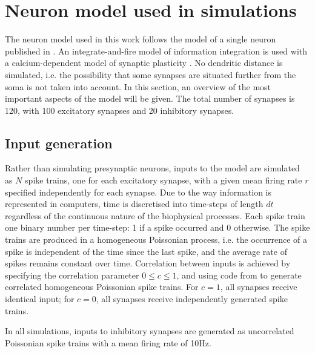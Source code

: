 \documentclass[a4paper,12pt]{report}
\theoremstyle{definition}
\begin{document}
\section{Neuron model used in simulations}

The neuron model used in this work follows the model of a single neuron published in \cite{yeung2004synaptic}. An integrate-and-fire model of information integration is used with a calcium-dependent model of synaptic plasticity \cite{shouval2002unified}. No dendritic distance is simulated, i.e. the possibility that some synapses are situated further from the soma is not taken into account. In this section, an overview of the most important aspects of the model will be given. The total number of synapses is 120, with 100 excitatory synapses and 20 inhibitory synapses.



\subsection{Input generation}
Rather than simulating presynaptic neurons, inputs to the model are simulated as $N$ spike trains, one for each excitatory synapse, with a given mean firing rate $r$ specified independently for each synapse. Due to the way information is represented in computers, time is discretised into time-steps of length $dt$ regardless of the continuous nature of the biophysical processes. Each spike train one binary number per time-step: 1 if a spike occurred and 0 otherwise. The spike trains are produced in a homogeneous Poissonian process, i.e. the occurrence of a spike is independent of the time since the last spike, and the average rate of spikes remains constant over time.
Correlation between inputs is achieved by specifying the correlation parameter $0 \leq c \leq 1$, and using code from \cite{macke2009} to generate correlated homogeneous Poissonian spike trains. For $c=1$, all synapses receive identical input; for $c=0$, all synapses receive independently generated spike trains.

In all simulations, inputs to inhibitory synapses are generated as uncorrelated Poissonian spike trains with a mean firing rate of 10Hz.
\end{document}

